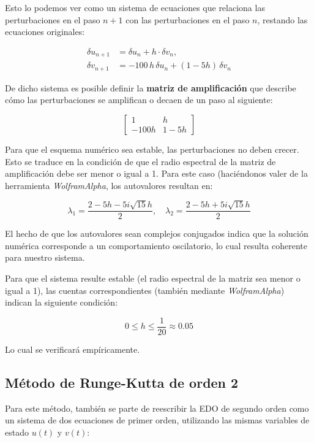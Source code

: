 \documentclass[titlepage,a4paper]{article}
\begin{document}
    Esto lo podemos ver como un sistema de ecuaciones que relaciona las perturbaciones en el paso $n+1$ con las perturbaciones en el paso $n$, restando las ecuaciones originales:

    \begin{align*}
        \delta u_{n+1} &= \delta u_n + h \cdot \delta v_n, \\
        \delta v_{n+1} & = -100\,h\,\delta u_n + (1 - 5h)\,\delta v_n
    \end{align*}

    De dicho sistema es posible definir la \textbf{matriz de amplificación} que describe cómo las perturbaciones se amplifican o decaen de un paso al siguiente:

    \[
    \begin{bmatrix}
    1 & h \\
    -100h & 1 - 5h
    \end{bmatrix}
    \]

    Para que el esquema numérico sea estable, las perturbaciones no deben crecer. Esto se traduce en la condición de que el radio espectral de la matriz de amplificación debe ser menor o igual a 1. Para este caso (haciéndonos valer de la herramienta \textit{WolframAlpha}, los autovalores resultan en:

    \[
        \lambda_1 = \frac{2 - 5h - 5i\sqrt{15}h}{2}, \quad \lambda_2 = \frac{2 - 5h + 5i\sqrt{15}h}{2}
    \]

    El hecho de que los autovalores sean complejos conjugados indica que la solución numérica corresponde a un comportamiento oscilatorio, lo cual resulta coherente para nuestro sistema. 

    Para que el sistema resulte estable (el radio espectral de la matriz sea menor o igual a 1), las cuentas correspondientes (también mediante \textit{WolframAlpha}) indican la siguiente condición:
    
    \[
    0 \leq h \leq \frac{1}{20} \approx 0.05
    \]
    
    Lo cual se verificará empíricamente. 


\subsection{Método de Runge-Kutta de orden 2}

Para este método, también se parte de reescribir la EDO de segundo orden como un sistema de dos ecuaciones de primer orden, utilizando las mismas variables de estado $u(t)$ y $v(t)$:
\end{document}
